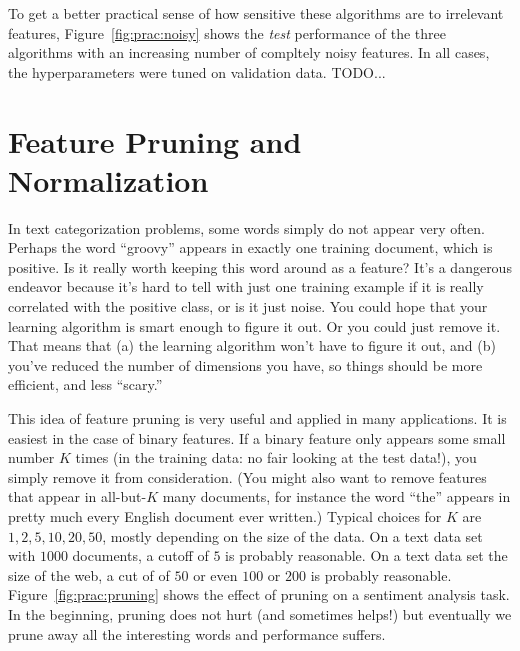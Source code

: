 
To get a better practical sense of how sensitive these algorithms are
to irrelevant features, Figure~\ref{fig:prac:noisy} shows the
\emph{test} performance of the three algorithms with an increasing
number of compltely noisy features.  In all cases, the hyperparameters
were tuned on validation data.  TODO...

\section{Feature Pruning and Normalization}

In text categorization problems, some words simply do not appear very
often.  Perhaps the word ``groovy''
appears in exactly one training document, which is positive.  Is it
really worth keeping this word around as a feature?  It's a dangerous
endeavor because it's hard to tell with just one training example if
it is really correlated with the positive class, or is it just noise.
You could hope that your learning algorithm is smart enough to figure
it out.  Or you could just remove it.  That means that (a) the
learning algorithm won't have to figure it out, and (b) you've reduced
the number of dimensions you have, so things should be more efficient,
and less ``scary.''


This idea of feature pruning is very useful and applied in many
applications.  It is easiest in the case of binary features.  If a
binary feature only appears some small number $K$ times (in the
training data: no fair looking at the test data!), you simply remove
it from consideration.  (You might also want to remove features that
appear in all-but-$K$ many documents, for instance the word ``the''
appears in pretty much every English document ever written.)  Typical
choices for $K$ are $1, 2, 5, 10, 20, 50$, mostly depending on the
size of the data.  On a text data set with $1000$ documents, a cutoff
of $5$ is probably reasonable.  On a text data set the size of the
web, a cut of of $50$ or even $100$ or $200$ is probably
reasonable.
Figure~\ref{fig:prac:pruning} shows the effect of pruning on a
sentiment analysis task.  In the beginning, pruning does not hurt (and
sometimes helps!) but eventually we prune away all the interesting
words and performance suffers.

